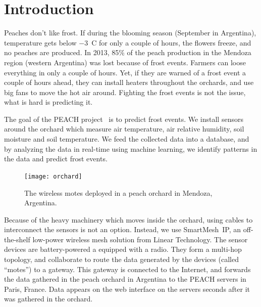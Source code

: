 \documentclass{sig-alternate}
\newcommand{\smip}                     {SmartMesh~IP\xspace}
\begin{document}
\section{Introduction}
\label{sec:intro}


Peaches don't like frost.
If during the blooming season (September in Argentina), temperature gets below $-$3~C for only a couple of hours, the flowers freeze, and no peaches are produced.
In 2013, 85\% of the peach production in the Mendoza region (western Argentina) was lost because of frost events.
Farmers can loose everything in only a couple of hours.
Yet, if they are warned of a frost event a couple of hours ahead, they can install heaters throughout the orchards, and use big fans to move the hot air around.
Fighting the frost events is not the issue, what is hard is predicting it.


The goal of the PEACH project~\cite{watteyne16peach} is to predict frost events.
We install sensors around the orchard which measure air temperature, air relative humidity, soil moisture and soil temperature.
We feed the collected data into a database, and by analyzing the data in real-time using machine learning, we identify patterns in the data and predict frost events.

\begin{figure}
    \centering
    \texttt{[image: orchard]}
    \caption{The wireless motes deployed in a peach orchard in Mendoza, Argentina.}
    \label{fig:orchard}
\end{figure}


Because of the heavy machinery which moves inside the orchard, using cables to interconnect the sensors is not an option.
Instead, we use \smip, an off-the-shelf low-power wireless mesh solution from Linear Technology.
The sensor devices are battery-powered a equipped with a radio.
They form a multi-hop topology, and collaborate to route the data generated by the devices (called ``motes'') to a gateway.
This gateway is connected to the Internet, and forwards the data gathered in the peach orchard in Argentina to the PEACH servers in Paris, France.
Data appears on the web interface on the servers seconds after it was gathered in the orchard.
\end{document}
